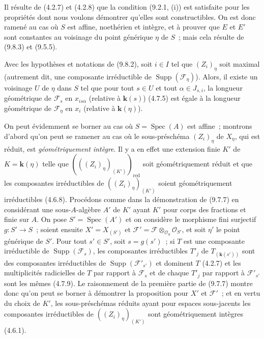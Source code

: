 
Il résulte de (4.2.7) et (4.2.8) que la condition (9.2.1, (i)) est satisfaite
pour les propriétés dont nous voulons démontrer qu'elles sont constructibles.
On est donc ramené au cas où $S$ est affine, noethérien et intègre, et à prouver
que $E$ et $E'$ sont constantes au voisinage du point générique $\eta$ de $S$~;
mais cela résulte de (9.8.3) et (9.5.5).

\begin{proposition}[9.8.6]
\label{IV.9.8.6-fr}
Avec les hypothèses et notations de (9.8.2), soit $i\in I$ tel que $(Z_i)_\eta$
soit maximal (autrement dit, une composante irréductible de
$\operatorname{Supp}(\mathcal F_\eta)$). Alors, il existe un voisinage $U$ de
$\eta$ dans $S$ tel que pour tout $s\in U$ et tout $\alpha\in J_{s,i}$, la
longueur géométrique de $\mathcal F_s$ en $x_{is\alpha}$ (relative à
$\boldsymbol{k}(s)$) (4.7.5) est égale à la longueur géométrique de
$\mathcal F_\eta$ en $x_i$ (relative à $\boldsymbol{k}(\eta)$).
\end{proposition}

On peut évidemment se borner au cas où $S=\operatorname{Spec}(A)$ est affine~;
montrons d'abord qu'on peut se ramener au cas où le sous-préschéma $(Z_i)_\eta$
de $X_\eta$, qui est réduit, est \emph{géométriquement intègre}. Il y a en effet
une extension finie $K'$ de $K=\boldsymbol{k}(\eta)$ telle que
$(((Z_i)_\eta)_{(K')})_{\mathrm{red}}$ soit géométriquement réduit et que les
composantes irréductibles de $((Z_i)_\eta)_{(K')}$ soient géométriquement
irréductibles (4.6.8). Procédons comme dans la démonstration de (9.7.7) en
considérant une sous-$A$-algèbre $A'$ de $K'$ ayant $K'$ pour corps des
fractions et finie sur $A$. On pose $S'=\operatorname{Spec}(A')$ et on considère
le morphisme fini surjectif $g:S'\to S$~; soient ensuite $X'=X_{(S')}$ et
$\mathcal F'=\mathcal F\otimes_{\mathcal O_S}\mathcal O_{S'}$, et soit $\eta'$
le point générique de $S'$. Pour tout $s'\in S'$, soit $s=g(s')$~; si $T$ est
une composante irréductible de $\operatorname{Supp}(\mathcal F_s)$, les
composantes irréductibles $T'_j$ de $T_{(\boldsymbol{k}(s'))}$ sont des
composantes irréductibles de $\operatorname{Supp}(\mathcal F'_{s'})$ et dominent
$T$ (4.2.7) et les multiplicités radicielles de $T$ par rapport à $\mathcal F_s$
et de chaque $T'_j$ par rapport à $\mathcal F'_{s'}$ sont les mêmes (4.7.9). Le
raisonnement de la première partie de (9.7.7) montre donc qu'on peut se borner à
démontrer la proposition pour $X'$ et $\mathcal F'$~; et en vertu du choix de
$K'$, les sous-préschémas réduits ayant pour espaces sous-jacents les composantes
irréductibles de $((Z_i)_\eta)_{(K')}$ sont géométriquement intègres (4.6.1).

